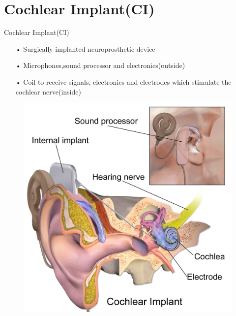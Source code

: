 \documentclass[notes=hide]{beamer}
\begin{document}
\section{Cochlear Implant(CI)}
\begin{frame}


   \begin{block}{Cochlear Implant(CI)}
   	\begin{itemize}
   		\item [•] Surgically implanted neuroprosthetic device 
   		\item [•] Microphones,sound processor and electronics(outside)
		\item [•] Coil to receive signals, electronics and electrodes which stimulate the cochlear nerve(inside)

		
   	\end{itemize}
   \end{block}
   \begin{figure}
   	\includegraphics[scale=0.091]{Vortrag/Cochlear_implant.png}
   \end{figure}
\end{frame}


\newpage
\end{document}

